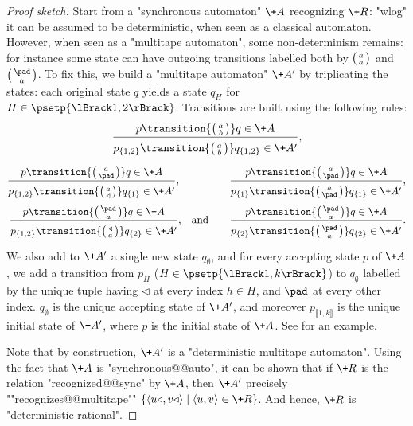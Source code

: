 \begin{proof}[Proof sketch]
	Start from a "synchronous automaton" $\+A$ recognizing $\+R$:
	"wlog" it can be assumed to be deterministic, when seen 
	as a classical automaton. However, when seen as a "multitape automaton", some non-determinism 
	remains: for instance some state can have outgoing transitions labelled both
	by $\pair{a}{a}$ and $\pair{\pad}{a}$.
	To fix this, we build a "multitape automaton" $\+A'$ by triplicating the states:
	each original state $q$ yields a state $q_H$ for $H \in \psetp{\lBrack 1,2 \rBrack}$.
	Transitions are built using the following rules:
	\[
		\frac{
			p \transition{\pair{a}{b}} q \in \+A
		}{
			p_{\{1,2\}} \transition{\pair{a}{b}} q_{\{1,2\}} \in \+A'
			\vphantom{\Big()}
		},
	\]
	\vspace{-2em}
	\begin{align*}
		\frac{
			p \transition{\pair{a}{\pad}} q \in \+A
		}{
			p_{\{1,2\}} \transition{\pair{a}{\triangleleft}} q_{\{1\}} \in \+A'
			\vphantom{\Big()}
		},\hphantom{\quad and}\qquad
		& 
		\frac{
			p \transition{\pair{a}{\pad}} q \in \+A	
		}{
			p_{\{1\}} \transition{\pair{a}{\pad}} q_{\{1\}} \in \+A'
			\vphantom{\Big()}
		}, \\
		\frac{
			p \transition{\pair{\pad}{a}} q \in \+A
		}{
			p_{\{1,2\}} \transition{\pair{\triangleleft}{a}} q_{\{2\}} \in \+A'
			\vphantom{\Big()}
		}\text{,\quad and}\qquad
		& 
		\frac{
			p \transition{\pair{\pad}{a}} q \in \+A
		}{
			p_{\{2\}} \transition{\pair{\pad}{a}} q_{\{2\}} \in \+A'
			\vphantom{\Big()}
		}.\\
	\end{align*}
	We also add to $\+A'$ a single new state $q_{\emptyset}$, and for every accepting state $p$ of
	$\+A$, we add a transition from $p_H$ ($H \in \psetp{\lBrack 1,k\rBrack}$) to $q_{\emptyset}$
	labelled by the unique tuple having $\triangleleft$ at every index $h \in H$,
	and $\pad$ at every other index.
	$q_{\emptyset}$ is the unique accepting state of $\+A'$, and moreover
	$p_{\lBrack 1,k\rBrack}$ is the unique initial state of $\+A'$, where $p$ is the initial state of $\+A$. See  for an example.
	
	Note that by construction, $\+A'$ is a "deterministic multitape automaton". 
	Using the fact that $\+A$ is "synchronous@@auto", it can be shown that
	if $\+R$ is the relation "recognized@@sync" by $\+A$, then $\+A'$ precisely 
	""recognizes@@multitape"" $\{\tup{u\triangleleft,v\triangleleft} \mid \tup{u,v} \in \+R\}$.
	And hence, $\+R$ is "deterministic rational".
\end{proof}

